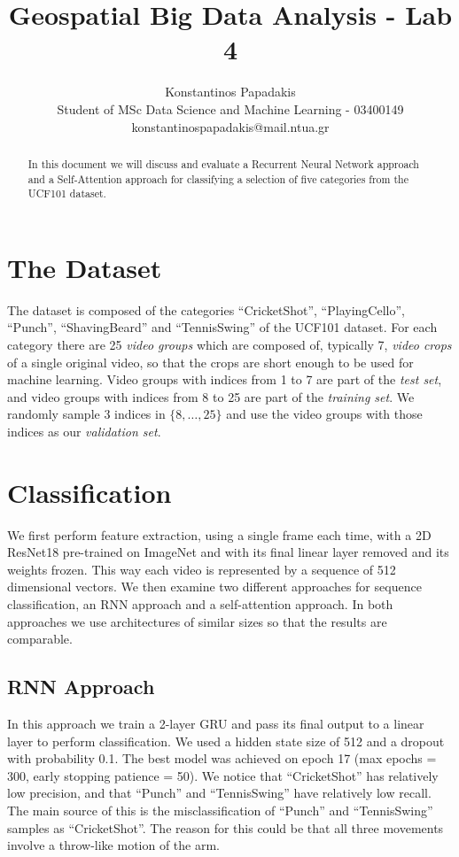 \documentclass{article}
\title{Geospatial Big Data Analysis - Lab 4}
\author{
    Konstantinos Papadakis\\
    Student of MSc Data Science and Machine Learning - 03400149\\
    konstantinospapadakis@mail.ntua.gr
}
\date{\vspace{-5ex}}
\begin{document}
\maketitle

\begin{abstract}
    In this document we will discuss and evaluate a Recurrent Neural Network approach and a Self-Attention approach for classifying a selection of five categories from the UCF101 dataset.
\end{abstract}

\section{The Dataset}
The dataset is composed of the categories “CricketShot”, “PlayingCello”, “Punch”, “ShavingBeard” and “TennisSwing” of the UCF101 dataset. For each category there are 25 \emph{video groups} which are composed of, typically 7, \emph{video crops} of a single original video, so that the crops are short enough to be used for machine learning. Video groups with indices from 1 to 7 are part of the \emph{test set}, and video groups with indices from 8 to 25 are part of the \emph{training set}. We randomly sample 3 indices in \(\{8, \dots , 25\}\) and use the video groups with those indices as our \emph{validation set}.

\section{Classification}
We first perform feature extraction, using a single frame each time, with a 2D ResNet18 pre-trained on ImageNet and with its final linear layer removed and its weights frozen. This way each video is represented by a sequence of 512 dimensional vectors. We then examine two different approaches for sequence classification, an RNN approach and a self-attention approach. In both approaches we use architectures of similar sizes so that the results are comparable.

\subsection{RNN Approach}
In this approach we train a 2-layer GRU and pass its final output to a linear layer to perform classification. We used a hidden state size of 512 and a dropout with probability 0.1. The best model was achieved on epoch 17 (max epochs = 300, early stopping patience = 50). We notice that “CricketShot” has relatively low precision, and that “Punch” and “TennisSwing” have relatively low recall. The main source of this is the misclassification of “Punch” and “TennisSwing” samples as “CricketShot”. The reason for this could be that all three movements involve a throw-like motion of the arm.
\end{document}
